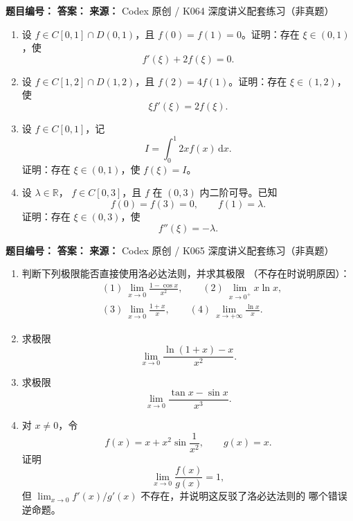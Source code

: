 
\begin{problemBox}
\begin{problemMeta}
\textbf{题目编号：}  \quad
\textbf{答案：}  \quad
\textbf{来源：} Codex 原创 / K064 深度讲义配套练习（非真题）
\end{problemMeta}

\begin{enumerate}
  \item[\textbf{A}] 设 \(f\in C[0,1]\cap D(0,1)\)，且
  \(f(0)=f(1)=0\)。证明：存在 \(\xi\in(0,1)\)，使
  \[
  f'(\xi)+2f(\xi)=0.
  \]

  \item[\textbf{B}] 设 \(f\in C[1,2]\cap D(1,2)\)，且
  \(f(2)=4f(1)\)。证明：存在 \(\xi\in(1,2)\)，使
  \[
  \xi f'(\xi)=2f(\xi).
  \]

  \item[\textbf{C}] 设 \(f\in C[0,1]\)，记
  \[
  I=\int_0^1 2x f(x)\,\mathrm dx.
  \]
  证明：存在 \(\xi\in(0,1)\)，使 \(f(\xi)=I\)。

  \item[\textbf{M}] 设 \(\lambda\in\mathbb R\)，
  \(f\in C[0,3]\)，且 \(f\) 在 \((0,3)\) 内二阶可导。已知
  \[
  f(0)=f(3)=0,\qquad f(1)=\lambda.
  \]
  证明：存在 \(\xi\in(0,3)\)，使
  \[
  f''(\xi)=-\lambda.
  \]
\end{enumerate}
\end{problemBox}

\begin{problemBox}
\begin{problemMeta}
\textbf{题目编号：}  \quad
\textbf{答案：}  \quad
\textbf{来源：} Codex 原创 / K065 深度讲义配套练习（非真题）
\end{problemMeta}

\begin{enumerate}
  \item[\textbf{A}] 判断下列极限能否直接使用洛必达法则，并求其极限
  （不存在时说明原因）：
  \[
  \begin{aligned}
  &(1)\ \lim_{x\to0}\frac{1-\cos x}{x^2},\qquad
  (2)\ \lim_{x\to0^+}x\ln x,\\
  &(3)\ \lim_{x\to0}\frac{1+x}{x},\qquad
  (4)\ \lim_{x\to+\infty}\frac{\ln x}{x}.
  \end{aligned}
  \]

  \item[\textbf{B}] 求极限
  \[
  \lim_{x\to0}\frac{\ln(1+x)-x}{x^2}.
  \]

  \item[\textbf{C}] 求极限
  \[
  \lim_{x\to0}\frac{\tan x-\sin x}{x^3}.
  \]

  \item[\textbf{M}] 对 \(x\ne0\)，令
  \[
  f(x)=x+x^2\sin\frac1{x^2},\qquad g(x)=x.
  \]
  证明
  \[
  \lim_{x\to0}\frac{f(x)}{g(x)}=1,
  \]
  但 \(\lim_{x\to0}f'(x)/g'(x)\) 不存在，并说明这反驳了洛必达法则的
  哪个错误逆命题。
\end{enumerate}
\end{problemBox}

